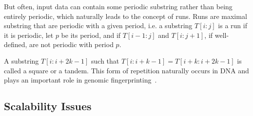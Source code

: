 But often, input data can contain some periodic substring rather than being entirely periodic,  which naturally leads to  the concept of runs. Runs are maximal substring that are periodic with a given period, i.e. a substring $T[i:j]$ is a run if it is periodic, let $p$ be its period, and if $T[i-1:j]$ and $T[i:j+1]$, if well-defined, are not periodic with period $p$.

A substring $T[i:i+2k-1]$ such that $T[i:i+k-1]=T[i+k:i+2k-1]$ is called a square or a tandem. This form of repetition naturally occurs in DNA and plays an important role in genomic fingerprinting~\cite{Kolpakov2003,GYMREK20179}.


\subsection{Scalability Issues}\label{sec:intro:scalability}

 
